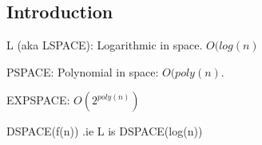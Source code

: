 
\subsection{Introduction}

L (aka LSPACE): Logarithmic in space. \(O(log(n)\)

PSPACE: Polynomial in space: \(O(poly(n)\).

EXPSPACE: \(O(2^{poly(n)})\)

DSPACE(f(n)) .ie L is DSPACE(log(n))


